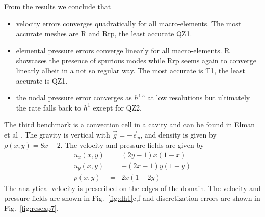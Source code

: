 \documentclass[a4paper,12pt]{article}
\begin{document}
From the results we conclude that
\begin{itemize}
\item velocity errors converges quadratically for all macro-elements.
The most accurate meshes are R and Rrp, the least accurate QZ1.
\item elemental pressure errors converge linearly for all macro-elements. R 
showcases the presence of spurious modes while Rrp seems again to converge linearly
albeit in a not so regular way. 
The most accurate is T1, the least accurate is QZ1.
\item the nodal pressure error converges as $h^{1.5}$ at low resolutions but ultimately 
the rate falls back to $h^1$ except for QZ2. 
\end{itemize}


The third benchmark is a convection cell in a cavity and can be found in Elman et al \cite{elsw}.
The gravity is vertical with $\vec{g}=-\vec{e}_y$, and 
density is given by $\rho(x,y)=8x-2$. The velocity and pressure fields are given by
\begin{eqnarray}
u_x(x,y) &=&  (2y-1)x(1-x) \\
u_y(x,y) &=& - (2x-1)y(1-y) \\
p(x,y) &=& 2x(1 - 2y)
\end{eqnarray}
The analytical velocity is prescribed on the edges of the domain. 
The velocity and pressure fields are shown in Fig.~\ref{fig:dh1}c,f
and discretization errors are shown in Fig.~\ref{fig:resexp7}.
\end{document}
